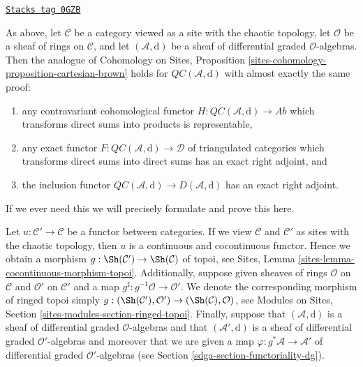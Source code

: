 \begin{remark}
\label{sdga-remark-cartesian-brown}
\href{https://stacks.math.columbia.edu/tag/0GZB}{\texttt{Stacks tag 0GZB}}

As above, let $\mathcal{C}$ be a category viewed as a site with
the chaotic topology, let $\mathcal{O}$ be a sheaf of rings on $\mathcal{C}$,
and let $(\mathcal{A}, \text{d})$ be a sheaf of differential graded
$\mathcal{O}$-algebras. Then the analogue of
Cohomology on Sites, Proposition
\ref{sites-cohomology-proposition-cartesian-brown}
holds for $\mathit{QC}(\mathcal{A}, \text{d})$ with almost
exactly the same proof:
\begin{enumerate}
\item any contravariant cohomological functor
$H : \mathit{QC}(\mathcal{A}, \text{d}) \to \textit{Ab}$
which transforms direct sums into products is representable,
\item any exact functor
$F : \mathit{QC}(\mathcal{A}, \text{d}) \to \mathcal{D}$
of triangulated categories which transforms direct sums into direct sums
has an exact right adjoint, and
\item the inclusion functor
$\mathit{QC}(\mathcal{A}, \text{d}) \to D(\mathcal{A}, \text{d})$ has
an exact right adjoint.
\end{enumerate}
If we ever need this we will precisely formulate and prove this here.
\end{remark}

Let $u : \mathcal{C}' \to \mathcal{C}$ be a functor between categories.
If we view $\mathcal{C}$ and $\mathcal{C}'$ as sites with the chaotic
topology, then $u$ is a continuous and cocontinuous functor. Hence
we obtain a morphism $g : \Sh(\mathcal{C}') \to \Sh(\mathcal{C})$
of topoi, see Sites, Lemma \ref{sites-lemma-cocontinuous-morphism-topoi}.
Additionally, suppose given sheaves of rings $\mathcal{O}$ on $\mathcal{C}$
and $\mathcal{O}'$ on $\mathcal{C}'$ and a map
$g^\sharp : g^{-1}\mathcal{O} \to \mathcal{O}'$.
We denote the corresponding morphism of ringed topoi simply
$g : (\Sh(\mathcal{C}'), \mathcal{O}') \to (\Sh(\mathcal{C}), \mathcal{O})$,
see Modules on Sites, Section \ref{sites-modules-section-ringed-topoi}.
Finally, suppose that $(\mathcal{A}, \text{d})$ is a sheaf of differential
graded $\mathcal{O}$-algebras and that
$(\mathcal{A}', \text{d})$ is a sheaf of differential
graded $\mathcal{O}'$-algebras and moreover that we are given a map
$\varphi : g^*\mathcal{A} \to \mathcal{A}'$ of differential graded
$\mathcal{O}'$-algebras (see Section \ref{sdga-section-functoriality-dg}).

